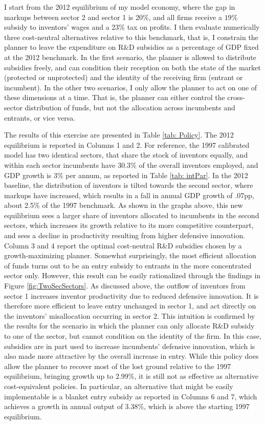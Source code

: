 I start from the 2012 equilibrium of my model economy, where the gap
in markups between sector 2 and sector 1 is 20\%, and all firms receive
a $19\%$ subsidy to inventors' wages and a 23\% tax on profits. I
then evaluate numerically three cost-neutral alternatives relative
to this benchmark, that is, I constrain the planner to leave the expenditure
on R\&D subsidies as a percentage of GDP fixed at the 2012 benchmark.
In the first scenario, the planner is allowed to distribute subsidies
freely, and can condition their reception on both the state of the
market (protected or unprotected) and the identity of the receiving
firm (entrant or incumbent). In the other two scenarios, I only allow
the planner to act on one of these dimensions at a time. That is,
the planner can either control the cross-sector distribution of funds,
but not the allocation across incumbents and entrants, or vice versa. 

The results of this exercise are presented in Table \ref{tab: Policy}.
The 2012 equilibrium is reported in Columns 1 and 2. For reference,
the 1997 calibrated model has two identical sectors, that share the
stock of inventors equally, and within each sector incumbents have
30.3\% of the overall inventors employed, and GDP growth is 3\% per
annum, as reported in Table \ref{tab: intPar}. In the 2012 baseline,
the distribution of inventors is tilted towards the second sector,
where markups have increased, which results in a fall in annual GDP
growth of .07pp, about 2.5\% of the 1997 benchmark. As shown in the
graphs above, this new equilibrium sees a larger share of inventors
allocated to incumbents in the second sectors, which increases its
growth relative to its more competitive counterpart, and sees a decline
in productivity resulting from higher defensive innovation. Column
3 and 4 report the optimal cost-neutral R\&D subsidies chosen by a
growth-maximizing planner. Somewhat surprisingly, the most efficient
allocation of funds turns out to be an entry subsidy to entrants in
the more concentrated sector only. However, this result can be easily
rationalized through the findings in Figure \ref{fig:TwoSecSectors}.
As discussed above, the outflow of inventors from sector 1 increases
inventor productivity due to reduced defensive innovation. It is therefore
more efficient to leave entry unchanged in sector 1, and act directly
on the inventors' misallocation occurring in sector 2. This intuition
is confirmed by the results for the scenario in which the planner
can only allocate R\&D subsidy to one of the sector, but cannot condition
on the identity of the firm. In this case, subsidies are in part used
to increase incumbents' defensive innovation, which is also made more
attractive by the overall increase in entry. While this policy does
allow the planner to recover most of the lost ground relative to the
1997 equilibrium, bringing growth up to 2.99\%, it is still not as
effective as alternative cost-equivalent policies. In particular,
an alternative that might be easily implementable is a blanket entry
subsidy as reported in Columns 6 and 7, which achieves a growth in
annual output of 3.38\%, which is above the starting 1997 equilibrium. 

